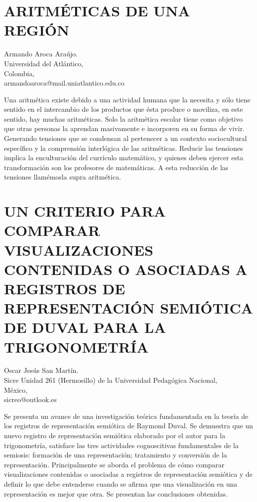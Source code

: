 \section{ARITMÉTICAS DE UNA REGIÓN}

\begin{datos}
Armando Aroca Araújo.\\
Universidad del Atlántico,\\
Colombia,\\
\hfill  armandoaroca@mail.uniatlantico.edu.co 
\end{datos}

Una aritmética existe debido a una actividad humana que la necesita
y sólo tiene sentido en el intercambio de los productos que ésta produce
o moviliza, en este sentido, hay muchas aritméticas. Solo la aritmética
escolar tiene como objetivo que otras personas la aprendan masivamente
e incorporen en su forma de vivir. Generando tensiones que se condensan
al pertenecer a un contexto sociocultural específico y la comprensión
interlógica de las aritméticas. Reducir las tensiones implica la enculturación
del currículo matemático, y quienes deben ejercer esta transformación
son los profesores de matemáticas. A esta reducción de las tensiones
llamémosla supra aritmética.


\section{UN CRITERIO PARA COMPARAR VISUALIZACIONES CONTENIDAS O ASOCIADAS
A REGISTROS DE REPRESENTACIÓN SEMIÓTICA DE DUVAL PARA LA TRIGONOMETRÍA}

\begin{datos}
Oscar Jesús San Martín.\\
Sicre Unidad 261 (Hermosillo) de la Universidad Pedagógica Nacional,\\
México,\\
\hfill  sicreo@outlook.es 
\end{datos}

Se presenta un avance de una investigación teórica fundamentada en
la teoría de los registros de representación semiótica de Raymond
Duval. Se demuestra que un nuevo registro de representación semiótica
elaborado por el autor para la trigonometría, satisface las tres actividades
cognoscitivas fundamentales de la semiosis: formación de una representación;
tratamiento y conversión de la representación. Principalmente se aborda
el problema de cómo comparar visualizaciones contenidas o asociadas
a registros de representación semiótica y de definir lo que debe entenderse
cuando se afirma que una visualización en una representación es mejor
que otra. Se presentan las conclusiones obtenidas. 


